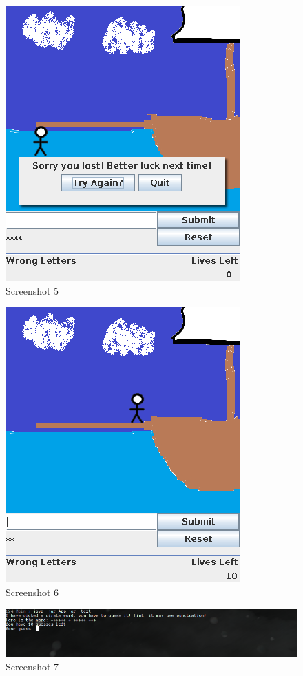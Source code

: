 \documentclass[notitlepage]{report}
\begin{document}
\begin{multicols}{2}
\begin{figure}[H]
\centering
\includegraphics[scale=0.5]{TestScreenshots/5}
\caption{Screenshot 5} 
\end{figure}

\begin{figure}[H]
\centering
\includegraphics[scale=0.5]{TestScreenshots/6}
\caption{Screenshot 6} 
\end{figure}
\end{multicols}

\begin{figure}[H]
\centering
\includegraphics[scale=0.5]{TestScreenshots/7}
\caption{Screenshot 7} 
\end{figure}
\end{document}
